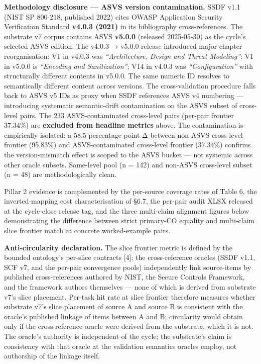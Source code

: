 \documentclass[
]{article}
\begin{document}
\textbf{Methodology disclosure --- ASVS version contamination.} SSDF
v1.1 (NIST SP 800-218, published 2022) cites OWASP Application Security
Verification Standard \textbf{v4.0.3 (2021)} in its bibliography
cross-references. The substrate v7 corpus contains ASVS \textbf{v5.0.0}
(released 2025-05-30) as the cycle's selected ASVS edition. The v4.0.3 →
v5.0.0 release introduced major chapter reorganisation: V1 in v4.0.3 was
\emph{``Architecture, Design and Threat Modeling''}; V1 in v5.0.0 is
\emph{``Encoding and Sanitization''}; V14 in v4.0.3 was
\emph{``Configuration''} with structurally different contents in v5.0.0.
The same numeric ID resolves to semantically different content across
versions. The cross-validation procedure falls back to ASVS v5 IDs as
proxy when SSDF references ASVS v4 numbering --- introducing systematic
semantic-drift contamination on the ASVS subset of cross-level pairs.
The 233 ASVS-contaminated cross-level pairs (per-pair frontier 37.34\%)
are \textbf{excluded from headline metrics} above. The contamination is
empirically isolated: a 58.5 percentage-point Δ between non-ASVS
cross-level frontier (95.83\%) and ASVS-contaminated cross-level
frontier (37.34\%) confirms the version-mismatch effect is scoped to the
ASVS bucket --- not systemic across other oracle subsets. Same-level
pool (n = 142) and non-ASVS cross-level subset (n = 48) are
methodologically clean.

Pillar 2 evidence is complemented by the per-source coverage rates of
Table 6, the inverted-mapping cost characterisation of §6.7, the
per-pair audit XLSX released at the cycle-close release tag, and the
three multi-claim alignment figures below demonstrating the difference
between strict primary-CO equality and multi-claim slice frontier match
at concrete worked-example pairs.

\textbf{Anti-circularity declaration.} The slice frontier metric is
defined by the bounded ontology's per-slice contracts {[}4{]}; the
cross-reference oracles (SSDF v1.1, SCF v7, and the per-pair convergence
pools) independently link source-items by published cross-references
authored by NIST, the Secure Controls Framework, and the framework
authors themselves --- none of which is derived from substrate v7's
slice placement. Per-task hit rate at slice frontier therefore measures
whether substrate v7's slice placement of source A and source B is
consistent with the oracle's published linkage of items between A and B;
circularity would obtain only if the cross-reference oracle were derived
from the substrate, which it is not. The oracle's authority is
independent of the cycle; the substrate's claim is consistency with that
oracle at the validation semantics oracles employ, not authorship of the
linkage itself.
\end{document}

